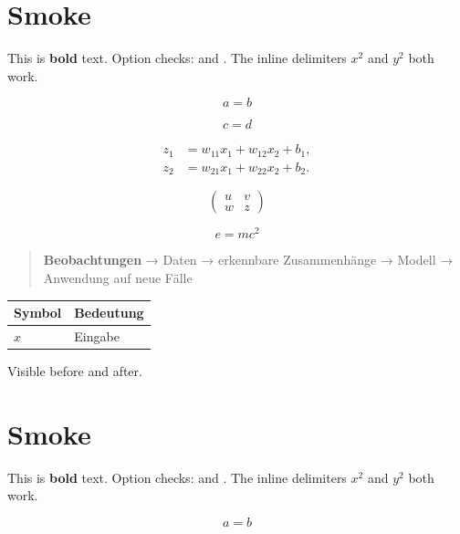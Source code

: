 \section{Smoke}

This is \textbf{bold} text.
Option checks: \cite{single} and \parencite{group}.
The inline delimiters $x^2$ and \(y^2\) both work.

\[
a = b
\]

\[
c = d
\]

\[
\begin{aligned}
z_1 &= w_{11}x_1+w_{12}x_2+b_1, \\
z_2 &= w_{21}x_1+w_{22}x_2+b_2.
\end{aligned}
\]

\[\begin{pmatrix}
u & v \\
w & z
\end{pmatrix}\]


\begin{equation}
e = mc^2
\end{equation}

\begin{quote}
\textbf{Beobachtungen} → Daten → erkennbare Zusammenhänge → Modell → Anwendung auf neue Fälle
\end{quote}

\par\addvspace{\medskipamount}
\noindent\begin{tabularx}{\linewidth}{@{}>{\raggedright\arraybackslash}X>{\raggedright\arraybackslash}X@{}}
\toprule
Symbol & Bedeutung \\
\midrule
$x$ & Eingabe \\
\bottomrule
\end{tabularx}
\par\addvspace{\medskipamount}

%
%
%
Visible before %
and after.

\section{Smoke}

This is \textbf{bold} text.
Option checks: \cite{single} and \parencite{group}.
The inline delimiters $x^2$ and \(y^2\) both work.

\[
a = b
\]

